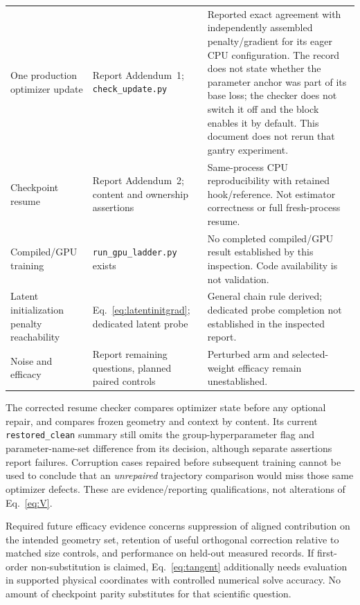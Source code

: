 \documentclass[11pt,a4paper]{article}
\newcommand{\code}[1]{\nolinkurl{#1}}
\theoremstyle{remark}
\begin{document}
\begin{longtable}{p{}p{}p{}}
One production optimizer update & Report Addendum~1; \code{check_update.py} & Reported exact agreement with independently assembled penalty/gradient for its eager CPU configuration. The record does not state whether the parameter anchor was part of its base loss; the checker does not switch it off and the block enables it by default. This document does not rerun that gantry experiment.\\
Checkpoint resume & Report Addendum~2; content and ownership assertions & Same-process CPU reproducibility with retained hook/reference. Not estimator correctness or full fresh-process resume.\\
Compiled/GPU training & \code{run_gpu_ladder.py} exists & No completed compiled/GPU result established by this inspection. Code availability is not validation.\\
Latent initialization penalty reachability & Eq.~\eqref{eq:latentinitgrad}; dedicated latent probe & General chain rule derived; dedicated probe completion not established in the inspected report.\\
Noise and efficacy & Report remaining questions, planned paired controls & Perturbed arm and selected-weight efficacy remain unestablished.\\
\bottomrule
\end{longtable}
\normalsize

The corrected resume checker compares optimizer state before any optional repair, and compares frozen geometry and context by content. Its current \code{restored_clean} summary still omits the group-hyperparameter flag and parameter-name-set difference from its decision, although separate assertions report failures. Corruption cases repaired before subsequent training cannot be used to conclude that an \emph{unrepaired} trajectory comparison would miss those same optimizer defects. These are evidence/reporting qualifications, not alterations of Eq.~\eqref{eq:V}.

Required future efficacy evidence concerns suppression of aligned contribution on the intended geometry set, retention of useful orthogonal correction relative to matched size controls, and performance on held-out measured records. If first-order non-substitution is claimed, Eq.~\eqref{eq:tangent} additionally needs evaluation in supported physical coordinates with controlled numerical solve accuracy. No amount of checkpoint parity substitutes for that scientific question.
\end{document}
